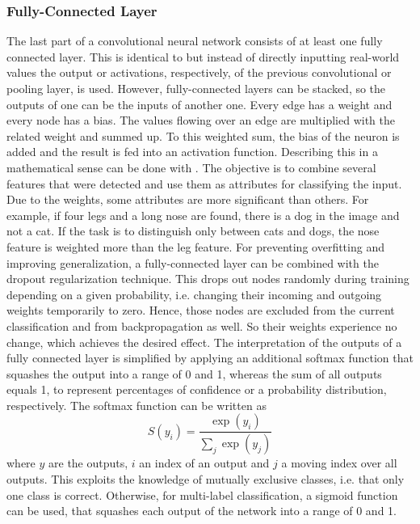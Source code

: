 \subsubsection{Fully-Connected Layer}
\label{sec:cnn-fully-connected}
The last part of a convolutional neural network consists of at least one fully connected layer.
This is identical to  but instead of directly inputting real-world values the output or activations, respectively, of the previous convolutional or pooling layer, is used.
However, fully-connected layers can be stacked, so the outputs of one can be the inputs of another one.
Every edge has a weight and every node has a bias.
The values flowing over an edge are multiplied with the related weight and summed up.
To this weighted sum, the bias of the neuron is added and the result is fed into an activation function.
Describing this in a mathematical sense can be done with .
The objective is to combine several features that were detected and use them as attributes for classifying the input.
Due to the weights, some attributes are more significant than others.
For example, if four legs and a long nose are found, there is a dog in the image and not a cat.
If the task is to distinguish only between cats and dogs, the nose feature is weighted more than the leg feature.
For preventing overfitting and improving generalization, a fully-connected layer can be combined with the dropout regularization technique\cite{Srivastava:2014:DSW:2627435.2670313}.
This drops out nodes randomly during training depending on a given probability, i.e. changing their incoming and outgoing weights temporarily to zero.
Hence, those nodes are excluded from the current classification and from backpropagation as well.
So their weights experience no change, which achieves the desired effect.
The interpretation of the outputs of a fully connected layer is simplified by applying an additional softmax function that squashes the output into a range of 0 and 1, whereas the sum of all outputs equals 1, to represent percentages of confidence or a probability distribution, respectively\cite{Bishop2006}.
The softmax function can be written as
\begin{equation}
	\label{eq:softmax}
	S(y_i) = \frac{\exp(y_i)}{\sum_{j} \exp(y_j)}
\end{equation}
where $y$ are the outputs, $i$ an index of an output and $j$ a moving index over all outputs.
This exploits the knowledge of mutually exclusive classes, i.e. that only one class is correct.
Otherwise, for multi-label classification, a sigmoid function can be used, that squashes each output of the network into a range of 0 and 1.
